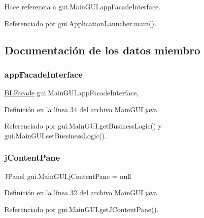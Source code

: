 Hace referencia a gui.\+Main\+G\+U\+I.\+app\+Facade\+Interface.



Referenciado por gui.\+Application\+Launcher.\+main().



\subsection{Documentación de los datos miembro}
\mbox{\label{classgui_1_1MainGUI_ab98521baef1c320483057345b5546d8d}} 
\subsubsection{\texorpdfstring{appFacadeInterface}{appFacadeInterface}}
{\footnotesize\ttfamily \mbox{\hyperlink{interfacebusinessLogic_1_1BLFacade}{B\+L\+Facade}} gui.\+Main\+G\+U\+I.\+app\+Facade\+Interface\hspace{0.3cm}{\ttfamily [static]}, {\ttfamily [private]}}



Definición en la línea 34 del archivo Main\+G\+U\+I.\+java.



Referenciado por gui.\+Main\+G\+U\+I.\+get\+Business\+Logic() y gui.\+Main\+G\+U\+I.\+set\+Bussiness\+Logic().

\mbox{\label{classgui_1_1MainGUI_a06836509371b16181fdff6732938b7d3}} 
\subsubsection{\texorpdfstring{jContentPane}{jContentPane}}
{\footnotesize\ttfamily J\+Panel gui.\+Main\+G\+U\+I.\+j\+Content\+Pane = null\hspace{0.3cm}{\ttfamily [private]}}



Definición en la línea 32 del archivo Main\+G\+U\+I.\+java.



Referenciado por gui.\+Main\+G\+U\+I.\+get\+J\+Content\+Pane().

\mbox{\label{classgui_1_1MainGUI_a8e1428e62a631616aefdafe08773cb96}} 
